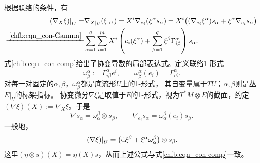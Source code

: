 根据联络的条件，有
\begin{equation}\label{chfb:eqn_con-comp}
\begin{aligned}
    \left. (\nabla_X \xi )\right|_U =& \nabla_{X|_U} (\xi |_U ) = X^i \nabla_{e_i}
    (\xi^\alpha s_\alpha ) = X^i \bigl((\nabla_{e_i} \xi^\alpha ) s_\alpha+
    \xi^\alpha \nabla_{e_i} s_\alpha \bigr) \\
    \xlongequal{\ref{chfb:eqn_con-Gamma}}&
    \sum_{\alpha=1}^{q}\sum_{i=1}^{m}
    X^i\left(e_i(\xi^\alpha)+\sum_{\beta=1}^{q}\xi^\beta\Gamma^\alpha_{i \beta}\right)s_\alpha .
\end{aligned}
\end{equation}
式\eqref{chfb:eqn_con-comp}给出了协变导数的局部表达式。定义联络1-形式
\begin{equation}\label{chfb:eqn_con-form}
    \omega^\alpha_{\beta}:=\Gamma^\alpha_{i \beta}e^{i},\qquad
    \omega^\alpha_{\beta}(e_i)=\Gamma^\alpha_{i \beta}.
\end{equation}
对每一对固定的$\alpha,\beta$，$\omega^\alpha_{\beta}$都是底流形$U$上的1-形式，
其自变量属于$TU$；$\alpha,\beta$则是丛$E|_U$的标架指标。
协变微分$\nabla\xi$是取值于$E$的1-形式，视为$T^*M\otimes E$的截面，约定
$(\nabla\xi)(X):=\nabla_X\xi$。于是
\begin{equation}\label{chfb:eqn_Dsos}
    \nabla s_\alpha=\omega^\beta_{\alpha}\otimes s_\beta,\qquad
    \nabla_{e_i}s_\alpha=\omega^\beta_{\alpha}(e_i)s_\beta.
\end{equation}
一般地，
\begin{equation}
    \left.(\nabla\xi)\right|_U
    =\bigl(\dd \xi^\beta+\xi^\alpha\omega^\beta_{\alpha}\bigr)\otimes s_\beta.
\end{equation}
这里$(\eta\otimes s)(X)=\eta(X)s$，从而上述公式与式\eqref{chfb:eqn_con-comp}一致。

